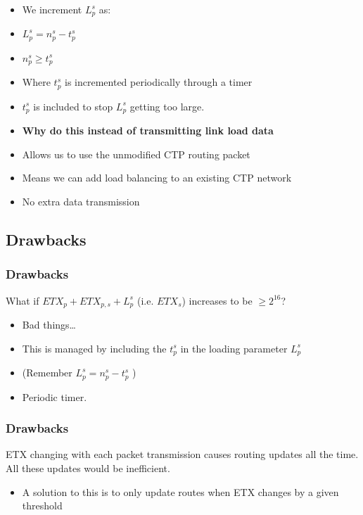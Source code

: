 \documentclass{beamer}
\begin{document}
\begin{frame}
  \begin{itemize}
    \item We increment $L_p^s$ as:
    \item $L_p^s = n_p^s - t_p^s$
    \item $n_p^s \geq t_p^s$
    \item Where $t_p^s$ is incremented periodically through a timer
    \item $t_p^s$ is included to stop $L_p^s$ getting too large.
    \item \textbf{Why do this instead of transmitting link load data}
    \item Allows us to use the unmodified CTP routing packet
    \item Means we can add load balancing to an existing CTP network
    \item No extra data transmission
  \end{itemize}

\end{frame}

\subsection{Drawbacks}

\begin{frame}[fragile]
  \frametitle{Drawbacks}
    What if $ETX_p + ETX_{p,s} + L_p^s$ (i.e. $ETX_s$) increases to be $\geq 2^{16}$?
  \begin{itemize}
    \item Bad things\ldots
    \item This is managed by including the $t_p^s$ in the loading parameter
    $L_p^s$
    \item (Remember $L_p^s = n_p^s - t_p^s$ )
    \item Periodic timer.
  \end{itemize}

\end{frame}  



\begin{frame}
  \frametitle{Drawbacks}
    ETX changing with each packet transmission causes routing updates all the
    time. All these updates would be inefficient.
  \begin{itemize}
    \item A solution to this is to only update routes when ETX changes by a given
    threshold
    \end{itemize}
\end{frame}  
\end{document}
